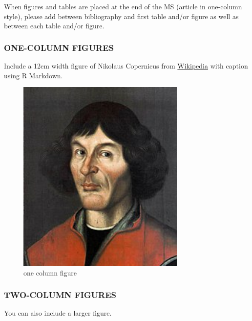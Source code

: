 \documentclass[gc, manuscript]{copernicus}
\begin{document}
When figures and tables are placed at the end of the MS (article in
one-column style), please add \clearpage between bibliography and first
table and/or figure as well as between each table and/or figure.

\subsubsection{ONE-COLUMN FIGURES}

Include a 12cm width figure of Nikolaus Copernicus from
\href{https://en.wikipedia.org/wiki/File:Nikolaus_Kopernikus.jpg}{Wikipedia}
with caption using R Markdown.

\begin{figure}
\includegraphics[width=8.3cm]{Nikolaus_Kopernikus} \caption{one column figure}\label{fig:unnamed-chunk-15}
\end{figure}

\subsubsection{TWO-COLUMN FIGURES}

You can also include a larger figure.
\end{document}
